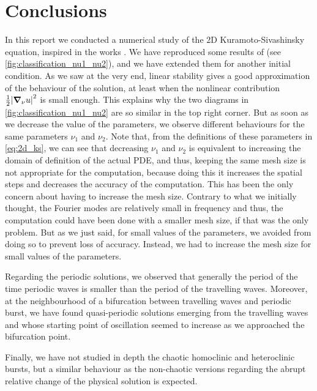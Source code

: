 \documentclass[twoside]{article}
\begin{document}
\section{Conclusions}
In this report we conducted a numerical study of the 2D Kuramoto-Sivashinsky equation, inspired in the works \cite{Kalogirou2015,phdthesis_anna}. We have reproduced some results of \cite{Kalogirou2015} (see \cref{fig:classification_nu1_nu2}), and we have extended them for another initial condition. As we saw at the very end, linear stability gives a good approximation of the behaviour of the solution, at least when the nonlinear contribution $\frac{1}{2}\abs{\grad_\nu u}^2$ is small enough. This explains why the two diagrams in \cref{fig:classification_nu1_nu2} are so similar in the top right corner. But as soon as we decrease the value of the parameters, we observe different behaviours for the same parameters $\nu_1$ and $\nu_2$. Note that, from the definitions of these parameters in \cref{eq:2d_ks}, we can see that decreasing $\nu_1$ and $\nu_2$ is equivalent to increasing the domain of definition of the actual PDE, and thus, keeping the same mesh size is not appropriate for the computation, because doing this it increases the spatial steps and decreases the accuracy of the computation. This has been the only concern about having to increase the mesh size. Contrary to what we initially thought, the Fourier modes are relatively small in frequency and thus, the computation could have been done with a smaller mesh size, if that was the only problem. But as we just said, for small values of the parameters, we avoided from doing so to prevent loss of accuracy. Instead, we had to increase the mesh size for small values of the parameters.

Regarding the periodic solutions, we observed that generally the period of the time periodic waves is smaller than the period of the travelling waves. Moreover, at the neighbourhood of a bifurcation between travelling waves and periodic burst, we have found quasi-periodic solutions emerging from the travelling waves and whose starting point of oscillation seemed to increase as we approached the bifurcation point.

Finally, we have not studied in depth the chaotic homoclinic and heteroclinic bursts, but a similar behaviour as the non-chaotic versions regarding the abrupt relative change of the physical solution is expected.
{}
\printbibliography
\end{document}
